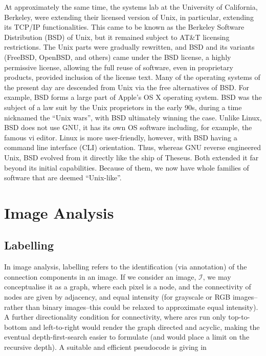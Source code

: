 \documentclass[11pt]{amsart}
\begin{document}
At approximately the same time, the systems lab at the University of California, Berkeley, were extending their licensed version of Unix, in particular, extending its TCP/IP functionalities. This came to be known as the Berkeley Software Distribution (BSD) of Unix, but it remained subject to AT\&T licensing restrictions. The Unix parts were gradually rewritten, and BSD and its variants (FreeBSD, OpenBSD, and others) came under the BSD license, a highly permissive license, allowing the full reuse of software, even in proprietary products, provided inclusion of the license text. Many of the operating systems of the present day are descended from Unix via the free alternatives of BSD. For example, BSD forms a large part of Apple's OS X operating system. BSD was the subject of a law suit by the Unix proprietors in the early 90s, during a time nicknamed the ``Unix wars'', with BSD ultimately winning the case. Unlike Linux, BSD does not use GNU, it has its own OS software including, for example, the famous vi editor. Linux is more user-friendly, however, with BSD having a command line interface (CLI) orientation. Thus, whereas GNU reverse engineered Unix, BSD evolved from it directly like the ship of Theseus. Both extended it far beyond its initial capabilities. Because of them, we now have whole families of software that are deemed ``Unix-like''.

\section{Image Analysis}

\subsection{Labelling}

In image analysis, labelling refers to the identification (via annotation) of the connection components in an image. If we consider an image, $\mathcal{I}$, we may conceptualise it as a graph, where each pixel is a node, and the connectivity of nodes are given by adjacency, and equal intensity (for grayscale or RGB images--rather than binary images--this could be relaxed to approximate equal intensity). A further directionality condition for connectivity, where arcs run only top-to-bottom and left-to-right would render the graph directed and acyclic, making the eventual depth-first-search easier to formulate (and would place a limit on the recursive depth). A suitable and efficient pseudocode is giving in 
\end{document}
